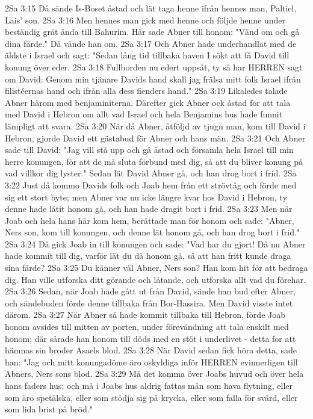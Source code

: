 2Sa 3:15  Då sände Is-Boset åstad och lät taga henne ifrån hennes man, Paltiel, Lais' son.
2Sa 3:16  Men hennes man gick med henne och följde henne under beständig gråt ända till Bahurim. Här sade Abner till honom: "Vänd om och gå dina färde." Då vände han om.
2Sa 3:17  Och Abner hade underhandlat med de äldste i Israel och sagt: "Sedan lång tid tillbaka haven I sökt att få David till konung över eder.
2Sa 3:18  Fullborden nu edert uppsåt, ty så har HERREN sagt om David: Genom min tjänare Davids hand skall jag frälsa mitt folk Israel ifrån filistéernas hand och ifrån alla dess fienders hand."
2Sa 3:19  Likaledes talade Abner härom med benjaminiterna. Därefter gick Abner ock åstad for att tala med David i Hebron om allt vad Israel och hela Benjamins hus hade funnit lämpligt att svara.
2Sa 3:20  När då Abner, åtföljd av tjugu man, kom till David i Hebron, gjorde David ett gästabud för Abner och hans män.
2Sa 3:21  Och Abner sade till David: "Jag vill stå upp och gå åstad och församla hela Israel till min herre konungen, för att de må sluta förbund med dig, så att du bliver konung på vad villkor dig lyster." Sedan lät David Abner gå, och han drog bort i frid.
2Sa 3:22  Just då kommo Davids folk och Joab hem från ett strövtåg och förde med sig ett stort byte; men Abner var nu icke längre kvar hos David i Hebron, ty denne hade låtit honom gå, och han hade dragit bort i frid.
2Sa 3:23  Men när Joab och hela hans här kom hem, berättade man för honom och sade: "Abner, Ners son, kom till konungen, och denne lät honom gå, och han drog bort i frid."
2Sa 3:24  Då gick Joab in till konungen och sade: "Vad har du gjort! Då nu Abner hade kommit till dig, varför lät du då honom gå, så att han fritt kunde draga sina färde?
2Sa 3:25  Du känner väl Abner, Ners son? Han kom hit för att bedraga dig. Han ville utforska ditt görande och låtande, och utforska allt vad du förehar.
2Sa 3:26  Sedan, när Joab hade gått ut från David, sände han bud efter Abner, och sändebuden förde denne tillbaka från Bor-Hassira. Men David visste intet därom.
2Sa 3:27  När Abner så hade kommit tillbaka till Hebron, förde Joab honom avsides till mitten av porten, under förevändning att tala enskilt med honom; där sårade han honom till döds med en stöt i underlivet - detta for att hämnas sin broder Asaels blod.
2Sa 3:28  När David sedan fick höra detta, sade han: "Jag och mitt konungadöme äro oskyldiga inför HERREN evinnerligen till Abners, Ners sons blod.
2Sa 3:29  Må det komma över Joabs huvud och över hela hans faders hus; och må i Joabs hus aldrig fattas män som hava flytning, eller som äro spetälska, eller som stödja sig på krycka, eller som falla för svärd, eller som lida brist på bröd."
